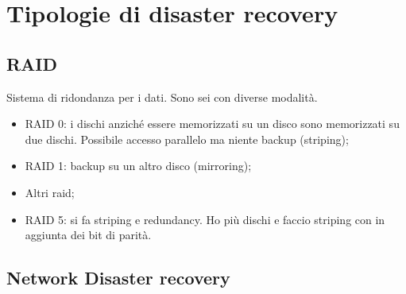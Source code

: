\begin{table}[H]
\centering
{}
\caption{Un esempio di BIA per una Università}
\end{table}


\section{Tipologie di disaster recovery}

\subsection{RAID}

Sistema di ridondanza per i dati. Sono sei con diverse modalità.
\begin{itemize}
  \item RAID 0: i dischi anziché essere memorizzati su un disco sono
  memorizzati su due dischi. Possibile accesso parallelo ma niente backup
  (striping);
  \item RAID 1: backup su un altro disco (mirroring);
  \item Altri raid;
  \item RAID 5: si fa striping e redundancy. Ho più dischi e faccio striping
  con in aggiunta dei bit di parità.
\end{itemize}

\subsection{Network Disaster recovery}

